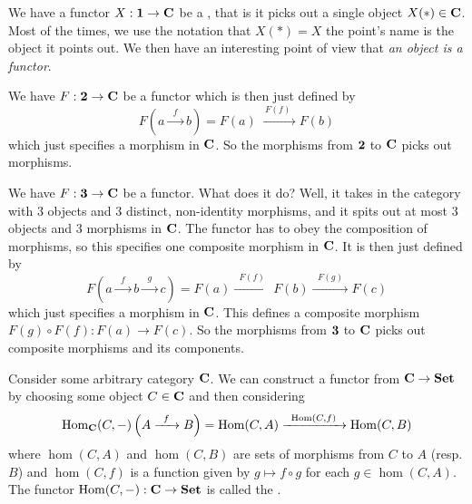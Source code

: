 \begin{ex}\label{ex:pointAsFunctor}
We have a functor $X:\mathbf{1}\to\mathbf{C}$ be a , that
is it picks out a single object $X(*)\in\mathbf{C}$. Most of the
times, we use the notation that $X(*)=X$ the point's name is the
object it points out. We then have an interesting point of view
that \emph{an object is a functor}.
\end{ex}
\begin{ex}\label{ex:morphismAsFunctor}
We have $F:\mathbf{2}\to\mathbf{C}$ be a functor which is then just
defined by
\begin{equation}
F\left(a\xrightarrow{\;\;f\;\;}b\right)=F(a)\xrightarrow{\;\;F(f)\;\;}F(b)
\end{equation}
which just specifies a morphism in $\mathbf{C}$. So the morphisms
from $\mathbf{2}$ to $\mathbf{C}$ picks out morphisms.
\end{ex}
\begin{ex}\label{ex:morphismAsFunctor}
We have $F:\mathbf{3}\to\mathbf{C}$ be a functor. What does it do? Well,
it takes in the category with 3 objects and 3 distinct,
non-identity morphisms, and it spits out at most 3 objects and 3
morphisms in $\mathbf{C}$. The functor has to obey the composition of
morphisms, so this specifies one composite morphism in
$\mathbf{C}$. It is then just defined by
\begin{equation}
F\left(a\xrightarrow{\;\;f\;\;}b\xrightarrow{\;\;g\;\;}c\right)=F(a)\xrightarrow{\;\;F(f)\;\;}F(b)\xrightarrow{\;\;F(g)\;\;}F(c)
\end{equation}
which just specifies a morphism in $\mathbf{C}$. This defines a
composite morphism $F(g)\circ{}F(f):F(a)\to{}F(c)$. So the morphisms
from $\mathbf{3}$ to $\mathbf{C}$ picks out composite morphisms and its components.
\end{ex}
\begin{ex}\label{ex:homFunctor}
Consider some arbitrary category $\mathbf{C}$. We can construct a
functor from $\mathbf{C}\to\mathbf{Set}$ by choosing some object
$C\in\mathbf{C}$ and then considering
\begin{equation}
\operatorname{Hom}_{\mathbf{C}}(C,-)\left(A\xrightarrow{\;\;f\;\;}B\right)=\operatorname{Hom}(C,A)\xrightarrow{\;\;\operatorname{Hom}(C,f)\;\;}\operatorname{Hom}(C,B)
\end{equation}
where $\hom(C,A)$ and $\hom(C,B)$ are sets of morphisms from $C$
to $A$ (resp. $B$) and $\hom(C,f)$ is a function given by
$g\mapsto f\circ{}g$ for each $g\in\hom(C,A)$. The functor
$\operatorname{Hom}(C,-):\mathbf{C}\to\mathbf{Set}$ is called the .
\end{ex}

